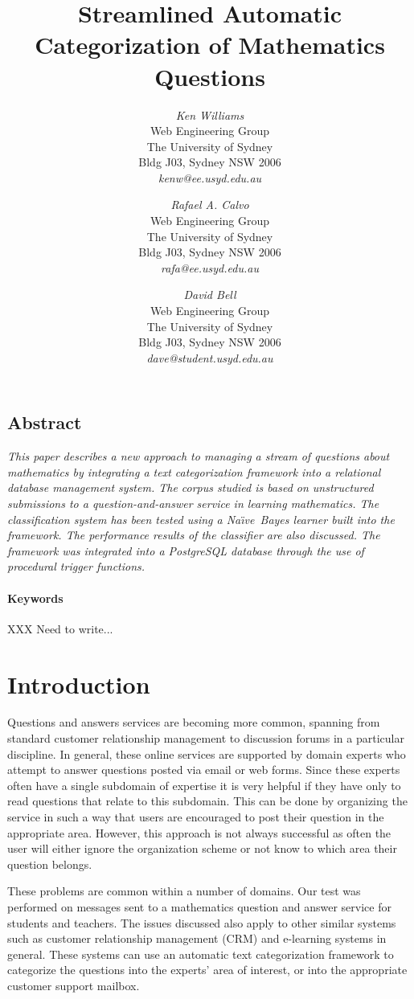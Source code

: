 \documentclass[twocolumn]{article}
\title{Streamlined Automatic Categorization of Mathematics Questions}
\author{
{\em Ken Williams}\\[1ex]
Web Engineering Group\\
The University of Sydney\\
Bldg J03, Sydney NSW 2006\\[1ex]
{\em kenw@ee.usyd.edu.au}
\and
{\em Rafael A. Calvo}\\[1ex]
Web Engineering Group\\
The University of Sydney\\
Bldg J03, Sydney NSW 2006\\[1ex]
{\em rafa@ee.usyd.edu.au}
\and
{\em David Bell}\\[1ex]
Web Engineering Group\\
The University of Sydney\\
Bldg J03, Sydney NSW 2006\\[1ex]
{\em dave@student.usyd.edu.au}
}
\newcommand{\naive}{Na\"\i ve}
\begin{document}
\maketitle
\thispagestyle{empty}


\subsection*{\centering Abstract}
\noindent
{\it 
This paper describes a new approach to managing a stream of questions about 
mathematics by integrating a text categorization framework into a relational database 
management system. The corpus studied is based on unstructured submissions to a 
question-and-answer service in learning mathematics. The classification system has 
been tested using a \naive\ Bayes learner built into the framework. The 
performance results of the classifier are also discussed. The framework was integrated 
into a PostgreSQL database through the use of procedural trigger functions.
}

\paragraph{Keywords} 
XXX Need to write...



\section{Introduction}

Questions and answers services are becoming more common, spanning from standard 
customer relationship management to discussion forums in a particular discipline. In 
general, these online services are supported by domain experts who attempt to answer 
questions posted via email or web forms. Since these experts often have a single subdomain of expertise it is 
very helpful if they have only to read questions that relate to this subdomain. This can be 
done by organizing the service in such a way that users are encouraged to post their 
question in the appropriate area. However, this approach is not always successful as 
often the user will either ignore the organization scheme or not know to which area their 
question belongs. 

These problems are common within a number of domains. Our test was performed on 
messages sent to a mathematics question and answer
service for students and teachers.\cite{drmath} The issues 
discussed also apply to other similar systems such as customer relationship 
management (CRM) and e-learning systems in general. These systems can use an 
automatic text categorization framework to categorize the questions into the experts' 
area of interest, or into the appropriate customer support mailbox. 
\end{document}
